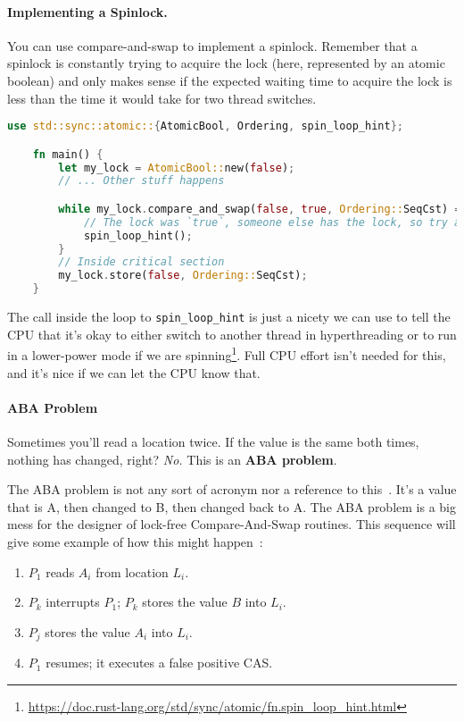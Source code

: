 \paragraph{Implementing a Spinlock.}
You can use compare-and-swap to implement a spinlock. Remember that a spinlock is constantly trying to acquire the lock (here, represented by an atomic boolean) and only makes sense if the expected waiting time to acquire the lock is less than the time it would take for two thread switches.

\begin{lstlisting}[language=Rust]
    use std::sync::atomic::{AtomicBool, Ordering, spin_loop_hint};

    fn main() {
        let my_lock = AtomicBool::new(false);
        // ... Other stuff happens

        while my_lock.compare_and_swap(false, true, Ordering::SeqCst) == true {
            // The lock was `true`, someone else has the lock, so try again
            spin_loop_hint();
        }
        // Inside critical section
        my_lock.store(false, Ordering::SeqCst);
    }
  \end{lstlisting}

The call inside the loop to \texttt{spin\_loop\_hint} is just a nicety we can use to tell the CPU that it's okay to either switch to another thread in hyperthreading or to run in a lower-power mode if we are spinning\footnote{\url{https://doc.rust-lang.org/std/sync/atomic/fn.spin_loop_hint.html}}. Full CPU effort isn't needed for this, and it's nice if we can let the CPU know that. 

\paragraph{ABA Problem}
Sometimes you'll read a location twice. If the value is the same both times, nothing has changed, right? \emph{No.} This is an {\bf ABA problem}.

The ABA problem is not any sort of acronym nor a reference to this~\cite{abba}. It's a value that is A, then changed to B, then changed back to A. The ABA problem is a big mess for the designer of lock-free Compare-And-Swap routines. This sequence will give some example of how this might happen~\cite{abaproblem}:

\begin{enumerate}
	\item $P_{1}$ reads $A_{i}$ from location $L_{i}$.
	\item $P_{k}$ interrupts $P_{1}$; $P_{k}$ stores the value $B$ into $L_{i}$.
	\item $P_{j}$ stores the value $A_{i}$ into $L_{i}$.
	\item $P_{1}$ resumes; it executes a false positive CAS.
\end{enumerate} 

